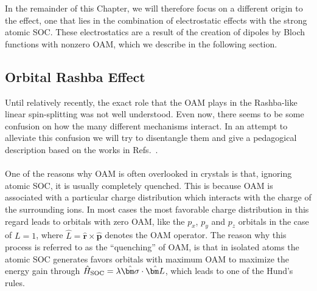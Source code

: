 In the remainder of this Chapter, we will therefore focus on a different origin to the effect, one that lies in the combination of electrostatic effects with the strong atomic SOC.
These electrostatics are a result of the creation of dipoles by Bloch functions with nonzero OAM, which we describe in the following section. 
\subsection{Orbital Rashba Effect}
Until relatively recently, the exact role that the OAM plays in the Rashba-like linear spin-splitting was not well understood. Even now, there seems to be some confusion on how the many different mechanisms interact.   
In an attempt to alleviate this confusion we will try to disentangle them and give a pedagogical description based on the works in Refs.~\cite{Petersen2000,Park2011,Park2012,Kim2014,Park2015,Go2016}.
\\\\
One of the reasons why OAM is often overlooked in crystals is that, ignoring atomic SOC, it is usually completely quenched.
This is because OAM is associated with a particular charge distribution which interacts with the charge of the surrounding ions.
In most cases the most favorable charge distribution in this regard leads to orbitals with zero OAM, like the $p_x$, $p_y$ and $p_z$ orbitals in the case of $L=1$, where $\hat{L} = \hat{\bm r} \times \hat{\bm p}$ denotes the OAM operator.
The reason why this process is referred to as the ``quenching'' of OAM, is that in isolated atoms the atomic SOC generates favors orbitals with maximum OAM to maximize the energy gain through $\hat{H}_{\rm SOC} = \lambda \hat{\bm \sigma} \cdot \hat{\bm L}$, which leads to one of the Hund's rules.
\\\\
